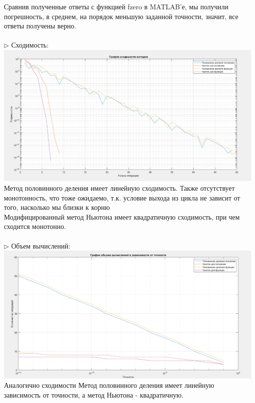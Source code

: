 \documentclass{article}
\begin{document}
	Сравнив полученные ответы с функцией fzero в MATLAB'е, мы получили погрешность, в среднем, на порядок меньшую заданной точности, значит, все ответы получены верно.\\
	\\
	$\triangleright$ Сходимость:\\
	\includegraphics[scale = 0.4]{Сходимость}\\
	Метод половинного деления имеет линейную сходимость. Также отсутствует монотонность, что тоже ожидаемо, т.к. условие выхода из цикла не зависит от того, насколько мы близки к корню\\
	Модифицированный метод Ньютона имеет квадратичную сходимость, при чем сходится монотонно.\\
	\\
	\newpage
	\hspace*{-0.65 cm} $\triangleright$ Объем вычислений:\\
	\includegraphics[scale = 0.41]{Объем вычислений}\\
	Аналогично сходимости Метод половинного деления имеет линейную зависимость от точности, а метод Ньютона - квадратичную.\\
	\\
\end{document}
